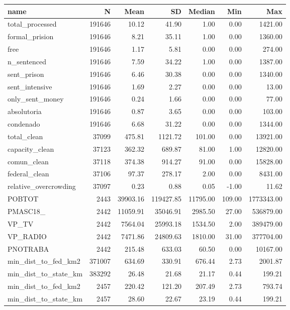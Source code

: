 
\begin{tabular}{lrrrrrr}
\toprule
name & N & Mean & SD & Median & Min & Max\\
\midrule
total\_processed & 191646 & 10.12 & 41.90 & 1.00 & 0.00 & 1421.00\\
formal\_prision & 191646 & 8.21 & 35.11 & 1.00 & 0.00 & 1360.00\\
free & 191646 & 1.17 & 5.81 & 0.00 & 0.00 & 274.00\\
n\_sentenced & 191646 & 7.59 & 34.22 & 1.00 & 0.00 & 1387.00\\
sent\_prison & 191646 & 6.46 & 30.38 & 0.00 & 0.00 & 1340.00\\
\addlinespace
sent\_intensive & 191646 & 1.69 & 2.27 & 0.00 & 0.00 & 13.00\\
only\_sent\_money & 191646 & 0.24 & 1.66 & 0.00 & 0.00 & 77.00\\
absolutoria & 191646 & 0.87 & 3.65 & 0.00 & 0.00 & 103.00\\
condenado & 191646 & 6.68 & 31.22 & 0.00 & 0.00 & 1344.00\\
total\_clean & 37099 & 475.81 & 1121.72 & 101.00 & 0.00 & 13921.00\\
\addlinespace
capacity\_clean & 37123 & 362.32 & 689.87 & 81.00 & 1.00 & 12820.00\\
comun\_clean & 37118 & 374.38 & 914.27 & 91.00 & 0.00 & 15828.00\\
federal\_clean & 37106 & 97.37 & 278.17 & 2.00 & 0.00 & 8431.00\\
relative\_overcrowding & 37097 & 0.23 & 0.88 & 0.05 & -1.00 & 11.62\\
POBTOT & 2443 & 39903.16 & 119427.85 & 11795.00 & 109.00 & 1773343.00\\
\addlinespace
PMASC18\_ & 2442 & 11059.91 & 35046.91 & 2985.50 & 27.00 & 536879.00\\
VP\_TV & 2442 & 7564.04 & 25993.18 & 1534.50 & 2.00 & 389479.00\\
VP\_RADIO & 2442 & 7471.86 & 24809.63 & 1810.00 & 31.00 & 377704.00\\
PNOTRABA & 2442 & 215.48 & 633.03 & 60.50 & 0.00 & 10167.00\\
min\_dist\_to\_fed\_km2 & 371007 & 634.69 & 330.91 & 676.44 & 2.73 & 2001.87\\
\addlinespace
min\_dist\_to\_state\_km & 383292 & 26.48 & 21.68 & 21.17 & 0.44 & 199.21\\
min\_dist\_to\_fed\_km2 & 2457 & 220.42 & 121.20 & 207.49 & 2.73 & 793.74\\
min\_dist\_to\_state\_km & 2457 & 28.60 & 22.67 & 23.19 & 0.44 & 199.21\\
\bottomrule
\end{tabular}

